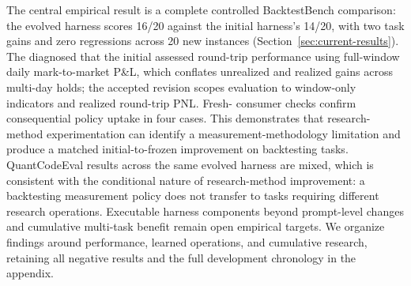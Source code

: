 The central empirical result is a complete controlled BacktestBench
comparison: the evolved harness scores 16/20 against the initial harness's
14/20, with two task gains and zero regressions across 20 new instances
(Section~\ref{sec:current-results}).  The \Evolver{} diagnosed that the
initial \Worker{} assessed round-trip performance using full-window daily
mark-to-market P\&L, which conflates unrealized and realized gains across
multi-day holds; the accepted revision scopes evaluation to window-only
indicators and realized round-trip PNL.  Fresh-\Worker{} consumer checks
confirm consequential policy uptake in four cases.  This demonstrates that
research-method experimentation can identify a measurement-methodology
limitation and produce a matched initial-to-frozen improvement on backtesting
tasks.  QuantCodeEval results across the same evolved harness are mixed, which
is consistent with the conditional nature of research-method improvement: a
backtesting measurement policy does not transfer to tasks requiring different
research operations.  Executable harness components beyond prompt-level
changes and cumulative multi-task benefit remain open empirical targets.
We organize findings around performance, learned operations, and cumulative
research, retaining all negative results and the full development chronology
in the appendix.
